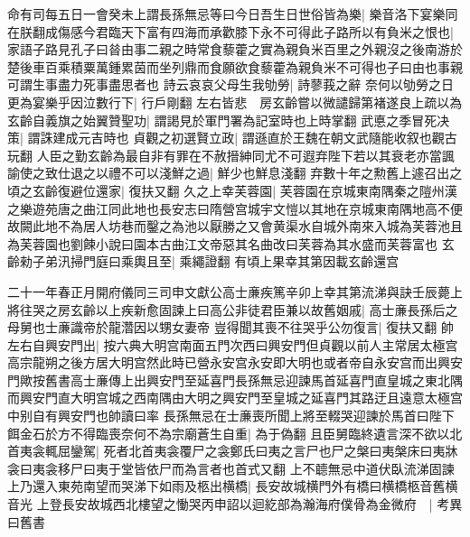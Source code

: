 命有司每五日一會癸未上謂長孫無忌等曰今日吾生日世俗皆為樂|{
	樂音洛下宴樂同}
在朕翻成傷感今君臨天下富有四海而承歡膝下永不可得此子路所以有負米之恨也|{
	家語子路見孔子曰㫺由事二親之時常食藜藿之實為親負米百里之外親沒之後南游於楚後車百乘積粟萬鍾累茵而坐列鼎而食願欲食藜藿為親負米不可得也子曰由也事親可謂生事盡力死事盡思者也}
詩云哀哀父母生我劬勞|{
	詩蓼莪之辭}
奈何以劬勞之日更為宴樂乎因泣數行下|{
	行戶剛翻}
左右皆悲　房玄齡嘗以微譴歸第褚遂良上疏以為玄齡自義旗之始翼贊聖功|{
	謂謁見於軍門署為記室時也上時掌翻}
武悳之季冒死决策|{
	謂誅建成元吉時也}
貞觀之初選賢立政|{
	謂遜直於王魏在朝文武隨能收叙也觀古玩翻}
人臣之勤玄齡為最自非有罪在不赦搢紳同尤不可遐弃陛下若以其衰老亦當諷諭使之致仕退之以禮不可以淺鮮之過|{
	鮮少也鮮息淺翻}
弃數十年之勲舊上遽召出之頃之玄齡復避位還家|{
	復扶又翻}
久之上幸芙蓉園|{
	芙蓉園在京城東南隅秦之隑州漢之樂遊苑唐之曲江同此地也長安志曰隋營宫城宇文愷以其地在京城東南隅地高不便故闕此地不為居人坊巷而鑿之為池以厭勝之又會黄渠水自城外南來入城為芙蓉池且為芙蓉園也劉餗小說曰園本古曲江文帝惡其名曲改曰芙蓉為其水盛而芙蓉富也}
玄齡勑子弟汛掃門庭曰乘輿且至|{
	乘繩證翻}
有頃上果幸其第因載玄齡還宫

二十一年春正月開府儀同三司申文獻公高士亷疾篤辛卯上幸其第流涕與訣壬辰薨上將往哭之房玄齡以上疾新愈固諫上曰高公非徒君臣兼以故舊姻戚|{
	高士亷長孫后之母舅也士亷識帝於龍濳因以甥女妻帝}
豈得聞其喪不往哭乎公勿復言|{
	復扶又翻}
帥左右自興安門出|{
	按六典大明宫南面五門次西曰興安門但貞觀以前人主常居太極宫高宗龍朔之後方居大明宫然此時已營永安宫永安即大明也或者帝自永安宫而出興安門歟按舊書高士亷傳上出興安門至延喜門長孫無忌迎諫馬首延喜門直皇城之東北隅而興安門直大明宫城之西南隅由大明之興安門至皇城之延喜門其路迂且遠意太極宫中别自有興安門也帥讀曰率}
長孫無忌在士亷喪所聞上將至輟哭迎諫於馬首曰陛下餌金石於方不得臨喪奈何不為宗廟蒼生自重|{
	為于偽翻}
且臣舅臨終遺言深不欲以北首夷衾輒屈鑾駕|{
	死者北首夷衾覆尸之衾鄭氏曰夷之言尸也尸之槃曰夷槃床曰夷牀衾曰夷衾移尸曰夷于堂皆依尸而為言者也首式又翻}
上不聼無忌中道伏臥流涕固諫上乃還入東苑南望而哭涕下如雨及柩出横橋|{
	長安故城横門外有橋曰横橋柩音舊横音光}
上登長安故城西北樓望之慟哭丙申詔以迴紇部為瀚海府僕骨為金微府　|{
	考異曰舊書}



